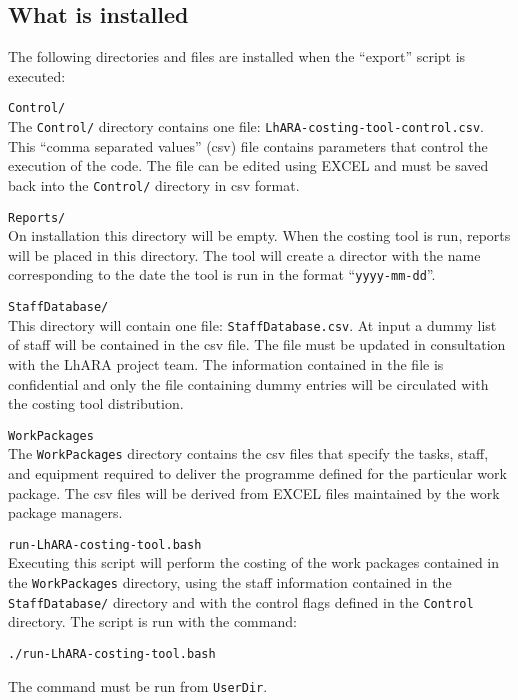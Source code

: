 \subsection*{\color{DarkGreen} What is installed}
The following directories and files are installed when the ``export''
script is executed:
\begin{description}
  \item {\tt Control/} \\
    The {\tt Control/} directory contains one file:
    {\tt LhARA-costing-tool-control.csv}.
    This ``comma separated values'' (csv) file contains parameters
    that control the execution of the code.
    The file can be edited using EXCEL and must be saved back into the
    {\tt Control/} directory in csv format.
  \item {\tt Reports/} \\
    On installation this directory will be empty.
    When the costing tool is run, reports will be placed in this
    directory.
    The tool will create a director with the name corresponding to the
    date the tool is run in the format ``{\tt yyyy-mm-dd}''.
  \item {\tt StaffDatabase/} \\
    This directory will contain one file: {\tt StaffDatabase.csv}.
    At input a dummy list of staff will be contained in the csv file.
    The file must be updated in consultation with the LhARA project
    team.
    The information contained in the file is confidential and only the
    file containing dummy entries will be circulated with the costing
    tool distribution.
  \item {\tt WorkPackages} \\
    The {\tt WorkPackages} directory contains the csv files that
    specify the tasks, staff, and equipment required to deliver the
    programme defined for the particular work package.
    The csv files will be derived from EXCEL files maintained by the
    work package managers.
  \item {\tt run-LhARA-costing-tool.bash} \\
    Executing this script will perform the costing of the work
    packages contained in the {\tt WorkPackages} directory, using the
    staff information contained in the {\tt StaffDatabase/} directory
    and with the control flags defined in the {\tt Control}
    directory.
    The script is run with the command:
    \begin{center}
      {\tt ./run-LhARA-costing-tool.bash}
    \end{center}
    The command must be run from {\tt UserDir}.
\end{description}

